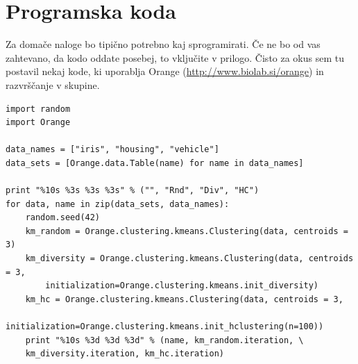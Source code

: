 \documentclass[a4paper,11pt]{article}
\begin{document}
\section{\label{app-code}Programska koda}

Za domače naloge bo tipično potrebno kaj sprogramirati. Če ne bo od
vas zahtevano, da kodo oddate posebej, to vključite v prilogo. Čisto
za okus sem tu postavil nekaj kode, ki uporablja Orange
(\url{http://www.biolab.si/orange}) in razvrščanje v skupine.


\begin{lstlisting}
import random
import Orange

data_names = ["iris", "housing", "vehicle"]
data_sets = [Orange.data.Table(name) for name in data_names]

print "%10s %3s %3s %3s" % ("", "Rnd", "Div", "HC")
for data, name in zip(data_sets, data_names):
    random.seed(42)
    km_random = Orange.clustering.kmeans.Clustering(data, centroids = 3)
    km_diversity = Orange.clustering.kmeans.Clustering(data, centroids = 3,
        initialization=Orange.clustering.kmeans.init_diversity)
    km_hc = Orange.clustering.kmeans.Clustering(data, centroids = 3,
        initialization=Orange.clustering.kmeans.init_hclustering(n=100))
    print "%10s %3d %3d %3d" % (name, km_random.iteration, \
    km_diversity.iteration, km_hc.iteration)
\end{lstlisting}
\end{document}
